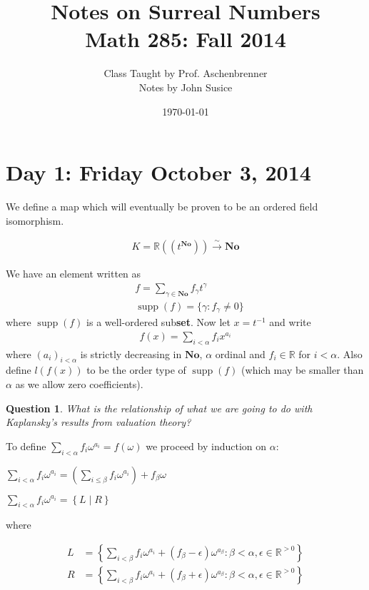 \documentclass{article}
\title{Notes on Surreal Numbers \\ Math 285: Fall 2014}
\author{Class Taught by Prof. Aschenbrenner \\ Notes by John Susice}
\date{\today}
\newcommand{\No}{\mathbf{No}}
\newcommand{\paren}[1]{\left( #1 \right)}
\newcommand{\curly}[1]{\left\{ #1 \right\}}
\newtheorem{question}{Question}
\newcommand{\R}{\mathbb{R}}
\DeclareMathOperator{\supp}{supp}
\newcommand{\w}{\omega}
\begin{document}
\maketitle{}

\section*{Day 1: Friday October 3, 2014}

We define a map which will eventually be proven to be an ordered field isomorphism.

\begin{align*}
  K = \R((t^\No)) \overset{\sim}{\longrightarrow} \No
\end{align*}

We have an element written as 
\begin{align*}
	&f = \sum_{\gamma \in \No} f_\gamma t^\gamma \\
	&\supp(f) = \{\gamma \colon f_\gamma \neq 0\}
\end{align*}
where $\supp(f)$ is a well-ordered sub\textbf{set}. Now let $x = t^{-1}$ and write
\begin{align*}
  f(x) = \sum_{i < \alpha} f_i x^{a_i}
\end{align*}
where $(a_i)_{i<\alpha}$ is strictly decreasing in $\No$, $\alpha$ ordinal and $f_i \in \R$ for $i < \alpha$. Also define $l(f(x))$ to be the order type of $\supp(f)$ (which may be smaller than $\alpha$ as we allow zero coefficients).

\begin{question}
	What is the relationship of what we are going to do with Kaplansky's results from valuation theory?
\end{question}

To define $\sum_{i < \alpha} f_i \w^{a_i} = f(\omega)$ we proceed by induction on $\alpha$:

$\sum_{i < \alpha} f_i \w^{a_i} = \paren{\sum_{i \leq \beta} f_i \omega^{a_i}} + f_\beta \w$

$\sum_{i < \alpha} f_i \w^{a_i} = \curly{L \mid R}$

where

\begin{align*}
  L &= \curly{\sum_{i < \beta} f_i \w^{a_i} + (f_\beta - \epsilon) \w^{a_\beta}
	\colon \beta < \alpha, \epsilon \in \R^{>0}} \\
  R &= \curly{\sum_{i < \beta} f_i \w^{a_i} + (f_\beta + \epsilon) \w^{a_\beta}
	\colon \beta < \alpha, \epsilon \in \R^{>0}}
\end{align*}
\end{document}
